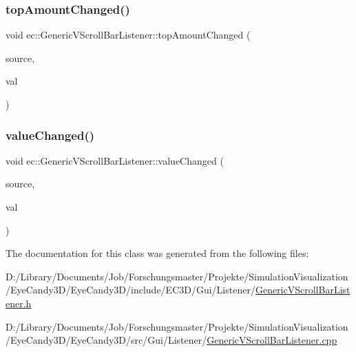 \mbox{\label{classec_1_1_generic_v_scroll_bar_listener_aa781034d565c6b2f50ffea047fd0dc5f}} 
\subsubsection{\texorpdfstring{top\+Amount\+Changed()}{topAmountChanged()}}
{\footnotesize\ttfamily void ec\+::\+Generic\+V\+Scroll\+Bar\+Listener\+::top\+Amount\+Changed (\begin{DoxyParamCaption}\item[{agui\+::\+V\+Scroll\+Bar $\ast$}]{source,  }\item[{int}]{val }\end{DoxyParamCaption})\hspace{0.3cm}{\ttfamily [override]}}

\mbox{\label{classec_1_1_generic_v_scroll_bar_listener_a6718d45dd6536a326181775dc2c16570}} 
\subsubsection{\texorpdfstring{value\+Changed()}{valueChanged()}}
{\footnotesize\ttfamily void ec\+::\+Generic\+V\+Scroll\+Bar\+Listener\+::value\+Changed (\begin{DoxyParamCaption}\item[{agui\+::\+V\+Scroll\+Bar $\ast$}]{source,  }\item[{int}]{val }\end{DoxyParamCaption})\hspace{0.3cm}{\ttfamily [override]}}



The documentation for this class was generated from the following files\+:\begin{DoxyCompactItemize}
\item 
D\+:/\+Library/\+Documents/\+Job/\+Forschungsmaster/\+Projekte/\+Simulation\+Visualization/\+Eye\+Candy3\+D/\+Eye\+Candy3\+D/include/\+E\+C3\+D/\+Gui/\+Listener/\mbox{\hyperlink{_generic_v_scroll_bar_listener_8h}{Generic\+V\+Scroll\+Bar\+Listener.\+h}}\item 
D\+:/\+Library/\+Documents/\+Job/\+Forschungsmaster/\+Projekte/\+Simulation\+Visualization/\+Eye\+Candy3\+D/\+Eye\+Candy3\+D/src/\+Gui/\+Listener/\mbox{\hyperlink{_generic_v_scroll_bar_listener_8cpp}{Generic\+V\+Scroll\+Bar\+Listener.\+cpp}}\end{DoxyCompactItemize}
